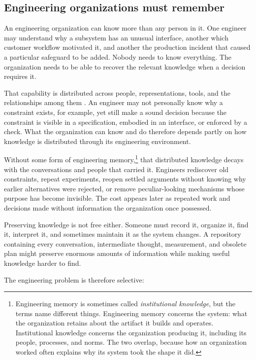 \subsection{Engineering organizations must remember}\label{sec-organizations-remember}

An engineering organization can know more than any person in it. One engineer may understand why a
subsystem has an unusual interface, another which customer workflow motivated it, and another the
production incident that caused a particular safeguard to be added. Nobody needs to know everything.
The organization needs to be able to recover the relevant knowledge when a decision requires it.

That capability is distributed across people, representations, tools, and the relationships among
them \citep{hutchins1995cockpit}. An engineer may not personally know why a constraint exists, for
example, yet still make a sound decision because the constraint is visible in a specification,
embodied in an interface, or enforced by a check. What the organization can know and do therefore
depends partly on how knowledge is distributed through its engineering environment.

Without some form of engineering memory,\footnote{Engineering memory is sometimes called \emph{institutional knowledge}, but the
  terms name different things. Engineering memory concerns the system: what the organization retains
  about the artifact it builds and operates. Institutional knowledge concerns the organization
  producing it, including its people, processes, and norms. The two overlap, because how an
  organization worked often explains why its system took the shape it did.} that distributed knowledge decays with
the conversations and people that carried it. Engineers rediscover old constraints, repeat
experiments, reopen settled arguments without knowing why earlier alternatives were rejected, or
remove peculiar-looking mechanisms whose purpose has become invisible. The cost appears later as
repeated work and decisions made without information the organization once possessed.

Preserving knowledge is not free either. Someone must record it, organize it, find it, interpret it,
and sometimes maintain it as the system changes. A repository containing every conversation,
intermediate thought, measurement, and obsolete plan might preserve enormous amounts of information
while making useful knowledge harder to find.

The engineering problem is therefore selective:

